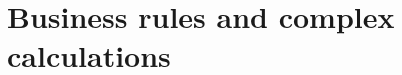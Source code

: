 \documentclass[Main]{subfiles}
\begin{document}
\section{Business rules and complex calculations}
\end{document}

